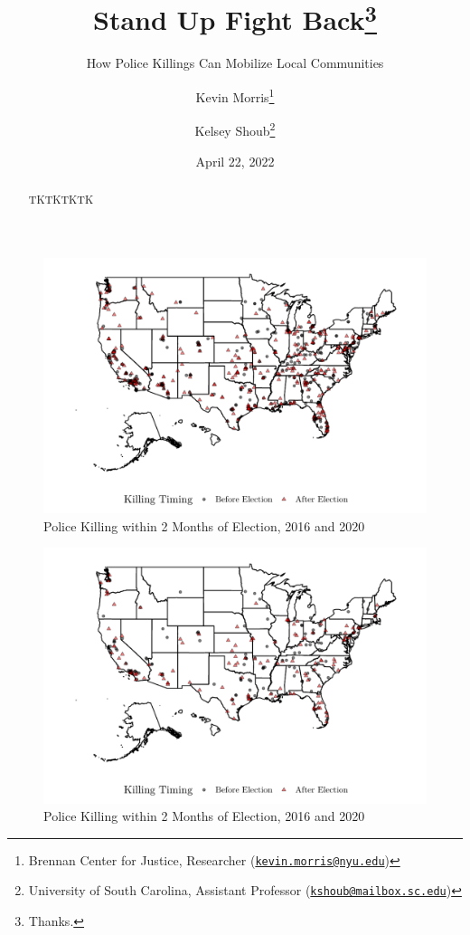 \documentclass[
  12pt,
]{article}
\title{Stand Up Fight Back\thanks{Thanks.}}
\subtitle{How Police Killings Can Mobilize Local Communities}
\author{Kevin Morris\footnote{Brennan Center for Justice, Researcher (\href{mailto:kevin.morris@nyu.edu}{\nolinkurl{kevin.morris@nyu.edu}})} \and Kelsey Shoub\footnote{University of South Carolina, Assistant Professor (\href{mailto:kshoub@mailbox.sc.edu}{\nolinkurl{kshoub@mailbox.sc.edu}})}}
\date{April 22, 2022}
\begin{document}
\maketitle
\begin{abstract}
TKTKTKTK
\end{abstract}

\pagebreak
\doublespacing


\begin{figure}[h]

{\centering \includegraphics{shoot_to_files/figure-latex/map-1} 

}

\caption{\label{fig:map}Police Killing within 2 Months of Election, 2016 and 2020}\label{fig:map}
\end{figure}

\begin{figure}[h]

{\centering \includegraphics{shoot_to_files/figure-latex/map-16-1} 

}

\caption{\label{fig:map}Police Killing within 2 Months of Election, 2016 and 2020}\label{fig:map-16}
\end{figure}
\end{document}

